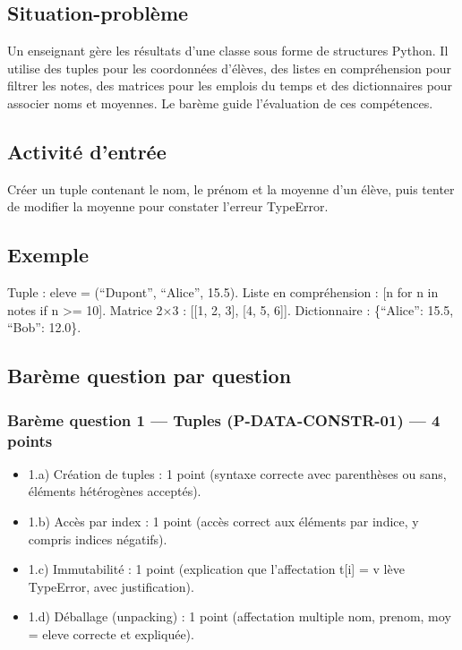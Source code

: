 \subsection{Situation-problème}

Un enseignant gère les résultats d'une classe sous forme de structures
Python. Il utilise des tuples pour les coordonnées d'élèves, des listes
en compréhension pour filtrer les notes, des matrices pour les emplois
du temps et des dictionnaires pour associer noms et moyennes. Le barème
guide l'évaluation de ces compétences.

\subsection{Activité d’entrée}

Créer un tuple contenant le nom, le prénom et la moyenne d'un élève,
puis tenter de modifier la moyenne pour constater l'erreur TypeError.

\subsection{Exemple}

Tuple : eleve = (``Dupont'', ``Alice'', 15.5). Liste en compréhension :
{[}n for n in notes if n \textgreater= 10{]}. Matrice 2×3 : {[}{[}1, 2,
3{]}, {[}4, 5, 6{]}{]}. Dictionnaire : \{``Alice'': 15.5, ``Bob'':
12.0\}.

\subsection{Barème question par question}

\subsubsection{Barème question 1 — Tuples (P-DATA-CONSTR-01) — 4 points}

\begin{itemize}
\tightlist
\item
  1.a) Création de tuples : 1 point (syntaxe correcte avec parenthèses
  ou sans, éléments hétérogènes acceptés).
\item
  1.b) Accès par index : 1 point (accès correct aux éléments par indice,
  y compris indices négatifs).
\item
  1.c) Immutabilité : 1 point (explication que l'affectation t{[}i{]} =
  v lève TypeError, avec justification).
\item
  1.d) Déballage (unpacking) : 1 point (affectation multiple nom,
  prenom, moy = eleve correcte et expliquée).
\end{itemize}

